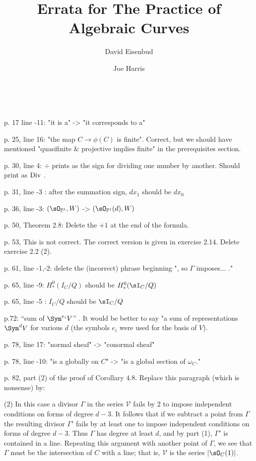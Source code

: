 \documentclass[twoside,12pt, leqno]{amsart}
\author[David Eisenbud]{David Eisenbud}
\author[Joe Harris ]{Joe Harris}
\title{Errata for The Practice of Algebraic Curves}
\def\PP{{\mathbb P}}
\begin{document}
\
\maketitle


\renewcommand{\thefootnote}{}%
%
p. 17 line -11: "it is a" -> "it corresponds to a"

p. 25, line 16: "the map $C \to \phi(C)$ is finite". Correct, but we should have mentioned "quasifinite \& projective implies finite" in the prerequisites section.

p. 30, line 4:  $\div$ prints as the sign for dividing one number by another. Should print as $\rm Div$ . 

p. 31, line -3 : after the summation sign, $dx_1$ should be $dx_0$

p. 36, line -3: $(\sO_{\PP^1}, W)$  -> $(\sO_{\PP^1}(d), W)$

p. 50, Theorem 2.8: Delete the $+1$ at the end of the formula.

p. 53, This is not correct. The correct version is given in exercise 2.14. Delete exercise 2.2 (2). 

p. 61, line -1,-2: delete the (incorrect) phrase beginning ", so $\Gamma$ imposes... ."

p. 65, line -9: $H^0_*(I_C/Q)$ should be $H^0_*(\sI_C/Q)$

p. 65, line -5 : $I_C/Q$ should be $\sI_C/Q$

p.72: ``sum of $\Sym^{e_i}V$'' . It would be better to say "a sum of representations $\Sym^dV$
for various $d$ (the symbols $e_i$ were used for the basis of $V$).

p. 78, line 17: "normal sheaf" -> "conormal sheaf"

p. 78, line -10: "is a globally on $C$" -> "is a global section of $\omega_C$."

p. 82, part (2) of the proof of Corollary 4.8. Replace this paragraph (which is nonsense) by:

(2) In this case a divisor $\Gamma$ in the series $\mathcal V$ fails by 2 to impose independent conditions
on forms of degree $d-3$. It follows that if we subtract a point from $\Gamma$ the resulting divisor $\Gamma'$ fails
by at least one to impose independent conditions on forms of degree $d-3$. Thus $\Gamma$ has degree
at least $d$, and by part (1), $\Gamma'$ is contained in a line. Repeating this argument with another point of $\Gamma$,
we see that $\Gamma$ must be the intersection of $C$ with a line; that is, $\mathcal V$ is the series $|\sO_C(1)|$.
\end{document}
